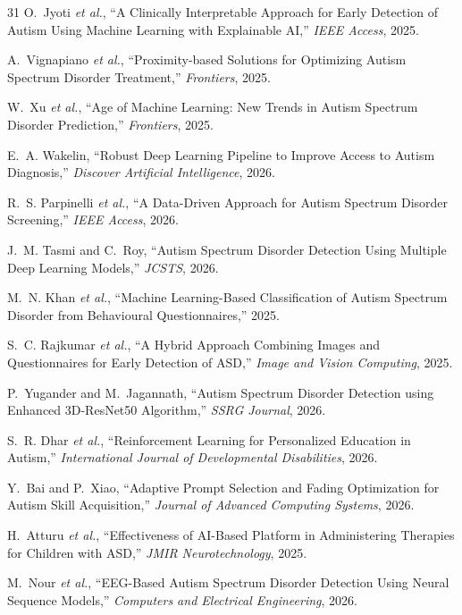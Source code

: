 \documentclass[conference]{IEEEtran}
\begin{document}
\begin{thebibliography}{31}
O.~Jyoti \emph{et al.}, ``A Clinically Interpretable Approach for Early Detection of Autism Using Machine Learning with Explainable AI,'' \emph{IEEE Access}, 2025.

A.~Vignapiano \emph{et al.}, ``Proximity-based Solutions for Optimizing Autism Spectrum Disorder Treatment,'' \emph{Frontiers}, 2025.

W.~Xu \emph{et al.}, ``Age of Machine Learning: New Trends in Autism Spectrum Disorder Prediction,'' \emph{Frontiers}, 2025.

E.~A. Wakelin, ``Robust Deep Learning Pipeline to Improve Access to Autism Diagnosis,'' \emph{Discover Artificial Intelligence}, 2026.

R.~S. Parpinelli \emph{et al.}, ``A Data-Driven Approach for Autism Spectrum Disorder Screening,'' \emph{IEEE Access}, 2026.

J.~M. Tasmi and C.~Roy, ``Autism Spectrum Disorder Detection Using Multiple Deep Learning Models,'' \emph{JCSTS}, 2026.

M.~N. Khan \emph{et al.}, ``Machine Learning-Based Classification of Autism Spectrum Disorder from Behavioural Questionnaires,'' 2025.

S.~C. Rajkumar \emph{et al.}, ``A Hybrid Approach Combining Images and Questionnaires for Early Detection of ASD,'' \emph{Image and Vision Computing}, 2025.

P.~Yugander and M.~Jagannath, ``Autism Spectrum Disorder Detection using Enhanced 3D-ResNet50 Algorithm,'' \emph{SSRG Journal}, 2026.

S.~R. Dhar \emph{et al.}, ``Reinforcement Learning for Personalized Education in Autism,'' \emph{International Journal of Developmental Disabilities}, 2026.

Y.~Bai and P.~Xiao, ``Adaptive Prompt Selection and Fading Optimization for Autism Skill Acquisition,'' \emph{Journal of Advanced Computing Systems}, 2026.

H.~Atturu \emph{et al.}, ``Effectiveness of AI-Based Platform in Administering Therapies for Children with ASD,'' \emph{JMIR Neurotechnology}, 2025.

M.~Nour \emph{et al.}, ``EEG-Based Autism Spectrum Disorder Detection Using Neural Sequence Models,'' \emph{Computers and Electrical Engineering}, 2026.


\end{thebibliography}
\end{document}
